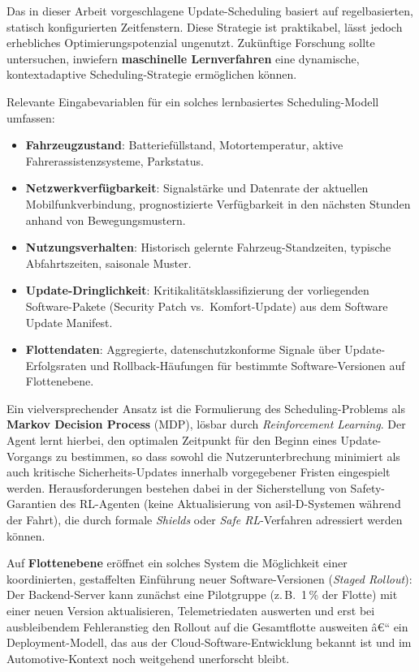 ﻿\documentclass[12pt,a4paper,twoside]{article}
\begin{document}
Das in dieser Arbeit vorgeschlagene Update-Scheduling basiert auf
regelbasierten, statisch konfigurierten Zeitfenstern. Diese Strategie
ist praktikabel, lässt jedoch erhebliches Optimierungspotenzial
ungenutzt. Zukünftige Forschung sollte untersuchen, inwiefern
\textbf{maschinelle Lernverfahren} eine dynamische, kontextadaptive
Scheduling-Strategie ermöglichen können.

Relevante Eingabevariablen für ein solches lernbasiertes Scheduling-Modell
umfassen:

\begin{itemize}
  \item \textbf{Fahrzeugzustand}: Batteriefüllstand,
    Motortemperatur, aktive Fahrerassistenzsysteme, Parkstatus.
  \item \textbf{Netzwerkverfügbarkeit}: Signalstärke und
    Datenrate der aktuellen Mobilfunkverbindung, prognostizierte
    Verfügbarkeit in den nächsten Stunden anhand von Bewegungsmustern.
  \item \textbf{Nutzungsverhalten}: Historisch gelernte
    Fahrzeug-Standzeiten, typische Abfahrtszeiten, saisonale
    Muster.
  \item \textbf{Update-Dringlichkeit}: Kritikalitätsklassifizierung
    der vorliegenden Software-Pakete (Security Patch vs.\ Komfort-Update)
    aus dem Software Update Manifest.
  \item \textbf{Flottendaten}: Aggregierte, datenschutzkonforme
    Signale über Update-Erfolgsraten und Rollback-Häufungen für
    bestimmte Software-Versionen auf Flottenebene.
\end{itemize}

Ein vielversprechender Ansatz ist die Formulierung des Scheduling-Problems
als \textbf{Markov Decision Process} (MDP), lösbar durch
\textit{Reinforcement Learning}. Der Agent lernt hierbei, den optimalen
Zeitpunkt für den Beginn eines Update-Vorgangs zu bestimmen, so dass
sowohl die Nutzerunterbrechung minimiert als auch kritische
Sicherheits-Updates innerhalb vorgegebener Fristen eingespielt werden.
Herausforderungen bestehen dabei in der Sicherstellung von
Safety-Garantien des RL-Agenten (keine Aktualisierung von
\gls{asil}-D-Systemen während der Fahrt), die durch formale
\textit{Shields} oder \textit{Safe RL}-Verfahren adressiert werden können.

Auf \textbf{Flottenebene} eröffnet ein solches System die Möglichkeit
einer koordinierten, gestaffelten Einführung neuer Software-Versionen
(\textit{Staged Rollout}): Der Backend-Server kann zunächst eine
Pilotgruppe (z.\,B.\ 1\,\% der Flotte) mit einer neuen Version
aktualisieren, Telemetriedaten auswerten und erst bei ausbleibendem
Fehleranstieg den Rollout auf die Gesamtflotte ausweiten â€“ ein
Deployment-Modell, das aus der Cloud-Software-Entwicklung bekannt ist
und im Automotive-Kontext noch weitgehend unerforscht bleibt.
\end{document}
